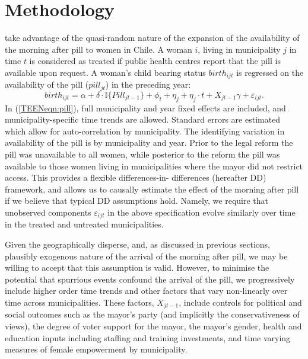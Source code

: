 \section{Methodology}
\label{TEENscn:ID}
\Person take advantage of the quasi-random nature of the expansion of the 
availability of the morning after pill to women in Chile.  A woman $i$, living
in municipality $j$ in time $t$ is considered as treated if public health 
centres report that the pill is available upon request.  A woman's child 
bearing status $birth_{ijt}$ is regressed on the availability of the pill 
($pill_{jt}$) in the preceding year:
\begin{equation}
 \label{TEENeqn:pill}
birth_{ijt} = \alpha + \delta\cdot \mathbb{I}\{Pill_{jt-1}\} + \phi_t + \eta_j + 
\eta_j\cdot t + X_{jt-1}\gamma + \varepsilon_{ijt}.
\end{equation}
In (\ref{TEENeqn:pill}), full municipality and year fixed effects are included,
and municipality-specific time trends are allowed.  Standard errors are 
estimated which allow for auto-correlation by municipality.  The identifying 
variation in availability of the pill is by municipality and year.  Prior to 
the legal reform the pill was unavailable to all women, while posterior to the
reform the pill was available to those women living in municipalities where the
mayor did not restrict access.  This provides a flexible differences-in-%
differences (hereafter DD) framework, and allows us to causally 
estimate the effect of the morning after pill if we believe that typical 
DD assumptions hold.  Namely, we require that unobserved components 
$\varepsilon_{ijt}$ in the above specification evolve similarly over time in 
the treated and untreated municipalities.

Given the geographically disperse, and, as discussed in previous sections,
plausibly exogenous nature of the arrival of the morning after pill, we may be
willing to accept that this assumption is valid.  However, to minimise the 
potential that spurrious events confound the arrival of the pill, we 
progressively include higher order time trends and other factors that vary 
non-linearly over time across municipalities.  These factors, $X_{jt-1}$, 
include controls for political and social outcomes such as the mayor's party
(and implicitly the conservativeness of views), the degree of voter support for
the mayor, the mayor's gender, health and education inputs including staffing
and training investments, and time varying measures of female empowerment by
municipality.

